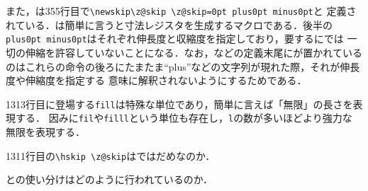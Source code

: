 \documentclass[autodetect-engine,dvipdfmx]{jsarticle}
\begin{document}
また，は355行目で\preSub\verb|\newskip\z@skip \z@skip=0pt plus0pt minus0pt|と
定義されている．は簡単に言うと寸法レジスタを生成するマクロである．後半の
\texttt{plus0pt minus0pt}はそれぞれ伸長度と収縮度を指定しており，要するにでは
一切の伸縮を許容していないことになる．なお，などの定義末尾にが置かれている
のはこれらの命令の後ろにたまたま``plus''などの文字列が現れた際，それが伸長度や伸縮度を指定する
意味に解釈されないようにするためである．

1313行目に登場する\texttt{fill}は特殊な単位であり，簡単に言えば「無限」の長さを表現する．
因みに\texttt{fil}や\texttt{filll}という単位も存在し，\texttt{l}の数が多いほどより強力な
無限を表現する．

\begin{question}
1311行目の\preSub\verb|\hskip \z@skip|はではだめなのか．
\end{question}

\begin{question}
との使い分けはどのように行われているのか．
\end{question}
\end{document}
